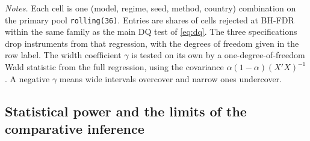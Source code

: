 \begin{table}[t]
\vspace{4pt}
{\footnotesize
\begin{minipage}{0.98\textwidth}
\textit{Notes.} Each cell is one (model, regime, seed, method, country) combination on the primary pool \texttt{rolling(36)}. Entries are shares of cells rejected at BH-FDR within the same family as the main DQ test of \cref{eq:dq}. The three specifications drop instruments from that regression, with the degrees of freedom given in the row label. The width coefficient $\gamma$ is tested on its own by a one-degree-of-freedom Wald statistic from the full regression, using the covariance $\alpha(1-\alpha)(X'X)^{-1}$. A negative $\gamma$ means wide intervals overcover and narrow ones undercover.
\end{minipage}}
\end{table}


\subsection{Statistical power and the limits of the comparative inference}
\label{sec:lim:inference}

